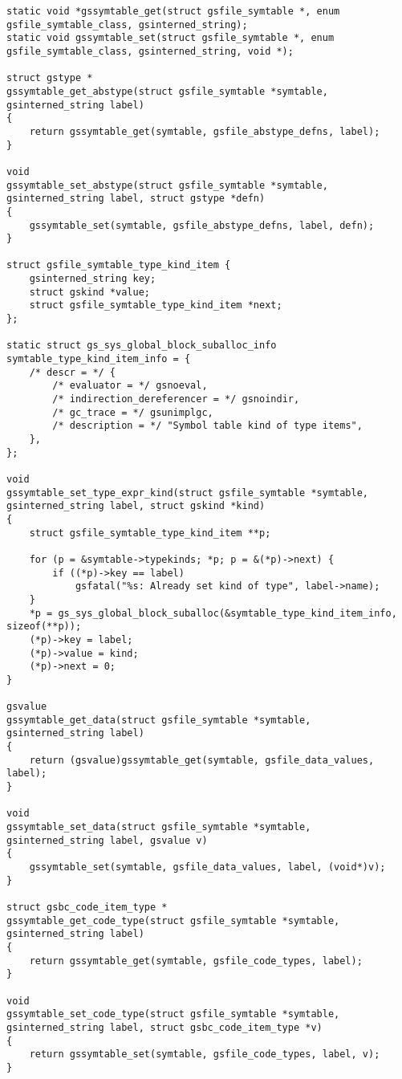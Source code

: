 \documentclass{report}
\begin{document}
\begin{verbatim}
static void *gssymtable_get(struct gsfile_symtable *, enum gsfile_symtable_class, gsinterned_string);
static void gssymtable_set(struct gsfile_symtable *, enum gsfile_symtable_class, gsinterned_string, void *);

struct gstype *
gssymtable_get_abstype(struct gsfile_symtable *symtable, gsinterned_string label)
{
    return gssymtable_get(symtable, gsfile_abstype_defns, label);
}

void
gssymtable_set_abstype(struct gsfile_symtable *symtable, gsinterned_string label, struct gstype *defn)
{
    gssymtable_set(symtable, gsfile_abstype_defns, label, defn);
}

struct gsfile_symtable_type_kind_item {
    gsinterned_string key;
    struct gskind *value;
    struct gsfile_symtable_type_kind_item *next;
};

static struct gs_sys_global_block_suballoc_info symtable_type_kind_item_info = {
    /* descr = */ {
        /* evaluator = */ gsnoeval,
        /* indirection_dereferencer = */ gsnoindir,
        /* gc_trace = */ gsunimplgc,
        /* description = */ "Symbol table kind of type items",
    },
};

void
gssymtable_set_type_expr_kind(struct gsfile_symtable *symtable, gsinterned_string label, struct gskind *kind)
{
    struct gsfile_symtable_type_kind_item **p;

    for (p = &symtable->typekinds; *p; p = &(*p)->next) {
        if ((*p)->key == label)
            gsfatal("%s: Already set kind of type", label->name);
    }
    *p = gs_sys_global_block_suballoc(&symtable_type_kind_item_info, sizeof(**p));
    (*p)->key = label;
    (*p)->value = kind;
    (*p)->next = 0;
}

gsvalue
gssymtable_get_data(struct gsfile_symtable *symtable, gsinterned_string label)
{
    return (gsvalue)gssymtable_get(symtable, gsfile_data_values, label);
}

void
gssymtable_set_data(struct gsfile_symtable *symtable, gsinterned_string label, gsvalue v)
{
    gssymtable_set(symtable, gsfile_data_values, label, (void*)v);
}

struct gsbc_code_item_type *
gssymtable_get_code_type(struct gsfile_symtable *symtable, gsinterned_string label)
{
    return gssymtable_get(symtable, gsfile_code_types, label);
}

void
gssymtable_set_code_type(struct gsfile_symtable *symtable, gsinterned_string label, struct gsbc_code_item_type *v)
{
    return gssymtable_set(symtable, gsfile_code_types, label, v);
}


\end{verbatim}
\end{document}
